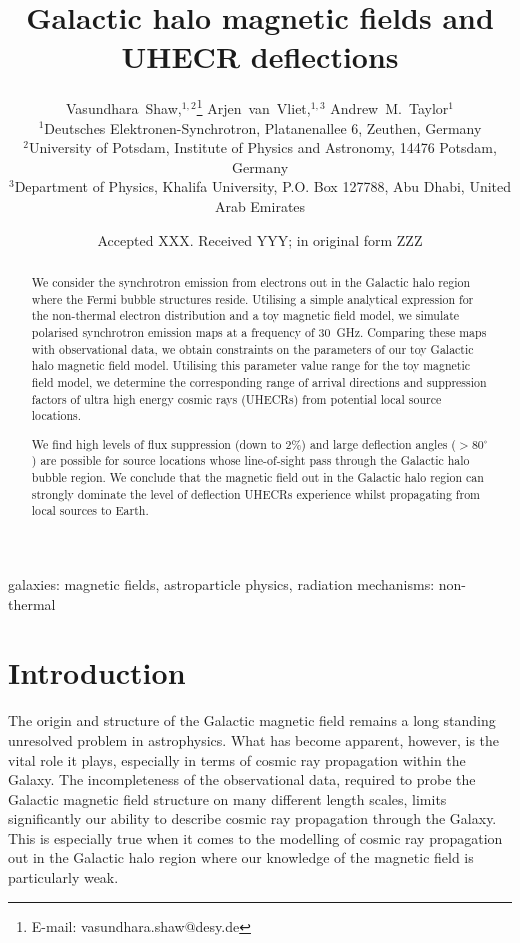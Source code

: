 \documentclass[usenatbib]{mnras}
\title{Galactic halo magnetic fields and UHECR deflections}
\author[V.~Shaw et al.]{
Vasundhara~Shaw,$^{1,2}$\thanks{E-mail: vasundhara.shaw@desy.de}
Arjen~van~Vliet,$^{1,3}$
Andrew~M.~Taylor$^{1}$
\\
$^{1}$Deutsches Elektronen-Synchrotron, Platanenallee 6, Zeuthen, Germany \\ %
$^{2}$University of Potsdam, Institute of Physics and Astronomy, 14476 Potsdam, Germany \\
$^{3}$Department of Physics, Khalifa University, P.O. Box 127788, Abu Dhabi, United Arab Emirates
}
\date{Accepted XXX. Received YYY; in original form ZZZ}
\begin{document}
\maketitle

\begin{abstract}
We consider the synchrotron emission from electrons out in the Galactic halo region where the Fermi bubble structures reside. Utilising a simple analytical expression for the non-thermal electron distribution and a toy magnetic field model, we simulate polarised synchrotron emission maps at a frequency of 30~GHz. Comparing these maps with observational data, we obtain constraints on the parameters of our toy Galactic halo magnetic field model. Utilising this parameter value range for the toy magnetic field model, we determine the corresponding range of arrival directions and suppression factors of ultra high energy cosmic rays (UHECRs) from potential local source locations.

We find high levels of flux suppression (down to 2\%) and large deflection angles ($>80^{\circ}$) are possible for source locations whose line-of-sight pass through the Galactic halo bubble region. We conclude that the magnetic field out in the Galactic halo region can strongly dominate the level of deflection UHECRs experience whilst propagating from local sources to Earth.
\end{abstract}

\begin{keywords}
galaxies: magnetic fields, astroparticle physics, radiation mechanisms: non-thermal
\end{keywords}


\section{Introduction}
\label{Introducion}

The origin and structure of the Galactic magnetic field remains a long standing unresolved problem in astrophysics. What has become apparent, however, is the vital role it plays, especially in terms of cosmic ray propagation within the Galaxy. The incompleteness of the observational data, required to probe the Galactic magnetic field structure on many different length scales, limits significantly our ability to describe cosmic ray propagation through the Galaxy. This is especially true when it comes to the modelling of cosmic ray propagation out in the Galactic halo region where our knowledge of the magnetic field is particularly weak.
\end{document}

